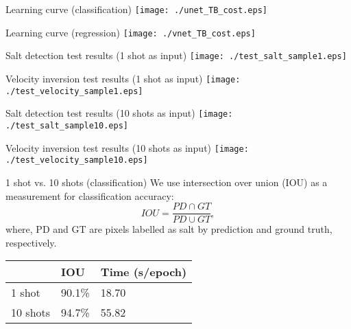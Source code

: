 \documentclass[aspectratio=169]{beamer}
\begin{document}
\begin{frame}{Learning curve (classification)}
    \center
    \texttt{[image: ./unet\_TB\_cost.eps]}
\end{frame}
\begin{frame}{Learning curve (regression)}
    \center
    \texttt{[image: ./vnet\_TB\_cost.eps]}
\end{frame}
\begin{frame}{Salt detection test results (1 shot as input)}
    \center
    \texttt{[image: ./test\_salt\_sample1.eps]}
\end{frame}
\begin{frame}{Velocity inversion test results (1 shot as input)}
    \center
    \texttt{[image: ./test\_velocity\_sample1.eps]}
\end{frame}
\begin{frame}{Salt detection test results (10 shots as input)}
    \center
    \texttt{[image: ./test\_salt\_sample10.eps]}
\end{frame}
\begin{frame}{Velocity inversion test results (10 shots as input)}
    \center
    \texttt{[image: ./test\_velocity\_sample10.eps]}
\end{frame}
\begin{frame}{}
\end{frame}
\begin{frame}{}
\end{frame}
\begin{frame}{1 shot vs. 10 shots (classification)}
\noindent 
We use intersection over union (IOU) as a measurement for classification accuracy:
\begin{equation}
IOU=\frac{PD \cap GT}{PD \cup GT},
\end{equation}
where, PD and GT are pixels labelled as salt by prediction and ground truth, respectively.
\begin{table}[]
\centering
\label{Comparison}
\begin{tabular}{|l|l|l|}
\hline
         & IOU    & Time (s/epoch) \\ \hline
1 shot   & 90.1\% & 18.70          \\ \hline
10 shots & 94.7\% & 55.82          \\ \hline
\end{tabular}
\end{table}
\end{frame}
\end{document}
